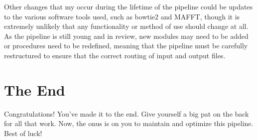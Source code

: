 \documentclass[12pt,titlepage]{article}
\begin{document}
Other changes that my occur during the lifetime of the pipeline could be updates to the various software tools used, such as bowtie2 and MAFFT, though it is extremely unlikely that any functionality or method of use should change at all. As the pipeline is still young and in review, new modules may need to be added or procedures need to be redefined, meaning that the pipeline must be carefully restructured to ensure that the correct routing of input and output files. 

\section*{The End}
Congratulations! You've made it to the end. Give yourself a big pat on the back for all that work. Now, the onus is on you to maintain and optimize this pipeline. Best of luck!
\end{document}
